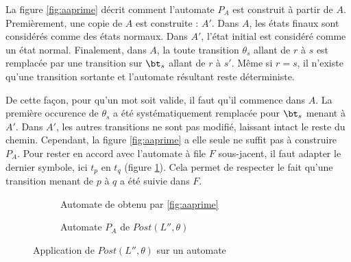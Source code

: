 La figure \ref{fig:aaprime} décrit comment l'automate $P_A$ est construit à partir de $A$. Premièrement, une copie de $A$ est construite : $A'$.
Dans $A$, les états finaux sont considérés comme des états normaux. Dans $A'$, l'état initial est considéré comme un état normal. Finalement, dans $A$, la toute transition $\theta_s$ allant de $r$ à $s$ est remplacée par une transition sur $\bt_s$ allant de $r$ à $s'$. Même si $r=s$, il n'existe qu'une transition sortante et l'automate résultant reste déterministe.

De cette façon, pour qu'un mot soit valide, il faut qu'il commence dans $A$. La première occurence de $\theta_s$ a été systématiquement remplacée pour $\bt_s$ menant à $A'$. Dans $A'$, les autres transitions ne sont pas modifié, laissant intact le reste du chemin. Cependant, la figure \ref{fig:aaprime} a elle seule ne suffit pas à construire $P_A$. Pour rester en accord avec l'automate à file $F$ sous-jacent, il faut adapter le dernier symbole, ici $t_p$ en $t_q$ (figure \ref{fig:pq}). Cela permet de respecter le fait qu'une transition menant de $p$ à $q$ a été suivie dans $F$.


\begin{figure}[H]
    \centering
    \begin{subfigure}{0.5\linewidth}
        \centering
        \caption{Automate de obtenu par \ref{fig:aaprime}}
    \end{subfigure}\hfill
    \begin{subfigure}{0.5\linewidth}
        \centering
        \caption{Automate $P_A$ de $Post(L'',\theta)$}
    \end{subfigure}
    \caption{Application de $Post(L'',\theta)$ sur un automate}\label{fig:pq}
\end{figure}















